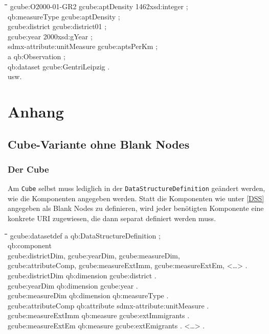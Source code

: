 \documentclass[a4paper,11pt]{article}
\newenvironment{code}{\tt \begin{tabbing}
\hskip12pt\=\hskip12pt\=\hskip12pt\=\hskip12pt\=\hskip5cm\=\hskip5cm\=\kill}
{\end{tabbing}}
\def\ppw{{\char94\char94}}
\begin{document}
\begin{code}
gcube:O2000-01-GR2 gcube:aptDensity {\dq}1462{\dq}{\ppw}xsd:integer ;\+\\
    qb:measureType gcube:aptDensity ;\\
    gcube:district gcube:district01 ;\\
    gcube:year {\dq}2000{\dq}{\ppw}xsd:gYear ;\\
    sdmx-attribute:unitMeasure gcube:aptsPerKm ;\\
    a qb:Observation ;\\
    qb:dataset gcube:GentriLeipzig .\-\\[6pt]

usw.
\end{code}

\section{Anhang}

\subsection{Cube-Variante ohne Blank Nodes}\label{noblank}

\subsubsection{Der Cube}

Am \texttt{Cube} selbst muss lediglich in der \texttt{DataStructureDefinition}
geändert werden, wie die Komponenten angegeben werden. Statt die Komponenten
wie unter \ref{DSS} angegeben als Blank Nodes zu definieren, wird jeder
benötigten Komponente eine konkrete URI zugewiesen, die dann separat definiert
werden muss.

\begin{code}
gcube:datasetdef a qb:DataStructureDefinition ;\+\\
    qb:component\+\\
        gcube:districtDim,
        gcube:yearDim,
        gcube:measureDim,\\
        gcube:attributeComp,
        gcube:measureExtImm,
        gcube:measureExtEm,
        <\ldots> .\-\-\\[6pt]
                 
gcube:districtDim      qb:dimension gcube:district .\\
gcube:yearDim          qb:dimension gcube:year .\\
gcube:measureDim       qb:dimension qb:measureType .\\
gcube:attributeComp    qb:attribute sdmx-attribute:unitMeasure .\\
gcube:measureExtImm    qb:measure   gcube:extImmigrants .\\
gcube:measureExtEm     qb:measure   gcube:extEmigrants .
<\ldots> .
\end{code}
\end{document}
